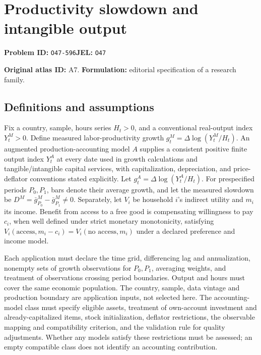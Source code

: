 \documentclass[11pt,a4paper]{article}
\begin{document}
\section*{Productivity slowdown and intangible output}
\textbf{Problem ID:} \texttt{O47-596}\quad \textbf{JEL:} \texttt{O47}\par
\label{problem:OP-0017}
\label{atlas:prob:A7}

\noindent\textbf{Original atlas ID:} A7. \textbf{Formulation:} editorial specification of a research family.

\subsection*{Definitions and assumptions}

Fix a country, sample, hours series $H_t>0$, and a conventional real-output index $Y_t^M>0$. Define measured labor-productivity growth $g_t^M=\Delta\log(Y_t^M/H_t)$. An augmented production-accounting model $A$ supplies a consistent positive finite output index $Y_t^A$ at every date used in growth calculations and tangible/intangible capital services, with capitalization, depreciation, and price-deflator conventions stated explicitly. Let $g_t^A=\Delta\log(Y_t^A/H_t)$. For prespecified periods $P_0,P_1$, bars denote their average growth, and let the measured slowdown be $D^M=\bar g_{P_0}^M-\bar g_{P_1}^M\ne0$. Separately, let $V_i$ be household $i$'s indirect utility and $m_i$ its income. Benefit from access to a free good is compensating willingness to pay $c_i$, when well defined under strict monetary monotonicity, satisfying $V_i(\text{access},m_i-c_i)=V_i(\text{no access},m_i)$ under a declared preference and income model.

Each application must declare the time grid, differencing lag and annualization, nonempty sets of growth observations for $P_0,P_1$, averaging weights, and treatment of observations crossing period boundaries. Output and hours must cover the same economic population. The country, sample, data vintage and production boundary are application inputs, not selected here. The accounting-model class must specify eligible assets, treatment of own-account investment and already-capitalized items, stock initialization, deflator restrictions, the observable mapping and compatibility criterion, and the validation rule for quality adjustments. Whether any models satisfy these restrictions must be assessed; an empty compatible class does not identify an accounting contribution.
\end{document}
